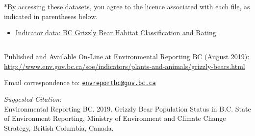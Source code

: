\documentclass[a4paper, 11pt, parskip=half]{scrartcl}
\providecommand{\tightlist}{%
  \setlength{\itemsep}{0pt}\setlength{\parskip}{0pt}}
\begin{document}
*By accessing these datasets, you agree to the licence associated with
each file, as indicated in parentheses below.

\begin{itemize}
\tightlist
\item
  \href{https://catalogue.data.gov.bc.ca/dataset/bc-grizzly-bear-habitat-classification-and-rating}{Indicator
  data: BC Grizzly Bear Habitat Classification and Rating}
\end{itemize}

\hypertarget{section}{%
\subsection{\texorpdfstring{\newpage}{}}\label{section}}

Published and Available On-Line at Environmental Reporting BC (August
2019):\\
\url{http://www.env.gov.bc.ca/soe/indicators/plants-and-animals/grizzly-bears.html}

Email correspondence to:
\href{mailto:envreportbc@gov.bc.ca}{\nolinkurl{envreportbc@gov.bc.ca}}

\emph{Suggested Citation}:\\
Environmental Reporting BC. 2019. Grizzly Bear Population Status in B.C.
State of Environment Reporting, Ministry of Environment and Climate
Change Strategy, British Columbia, Canada.
\end{document}
